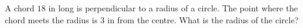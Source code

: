A chord $18$ in long is perpendicular to a radius of a circle. The point where the chord meets the radius is $3$ in from the centre. What is the radius of the circle?

